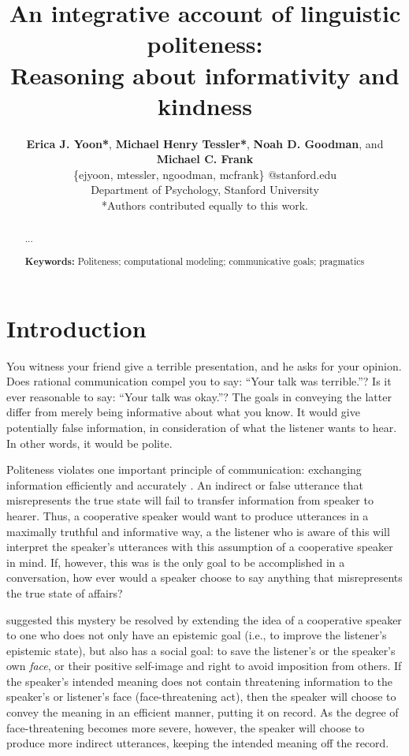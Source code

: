 \documentclass[10pt,letterpaper]{article}
\title{An integrative account of linguistic politeness: \\
Reasoning about informativity and kindness}
\author{ {\large \bf Erica J. Yoon*}, {\large \bf Michael Henry Tessler*}, {\large \bf Noah D. Goodman}, and {\large \bf Michael C. Frank}   \\
\{ejyoon, mtessler, ngoodman, mcfrank\} @stanford.edu \\ 
  Department of Psychology, Stanford University \\
  *Authors contributed equally to this work.}
\begin{document}
\maketitle


\begin{abstract}

...

\textbf{Keywords:} 
Politeness; computational modeling; communicative goals; pragmatics

\end{abstract}


\section{Introduction}

You witness your friend give a terrible presentation, and he asks for your opinion. 
Does rational communication compel you to say: ``Your talk was terrible.''?
Is it ever reasonable to say: ``Your talk was okay.''?
The goals in conveying the latter differ from merely being informative about what you know. 
It would give potentially false information, in consideration of what the listener wants to hear.
In other words, it would be polite.

Politeness violates one important principle of communication: exchanging information efficiently and accurately \cite{Grice1975}. An indirect or false utterance that misrepresents the true state will fail to transfer information from speaker to hearer. Thus, a cooperative speaker would want to produce utterances in a maximally truthful and informative way, a the listener who is aware of this will interpret the speaker's utterances with this assumption of a cooperative speaker in mind.
If, however, this was is the only goal to be accomplished in a conversation, how ever would a speaker choose to say anything that misrepresents the true state of affairs?

 suggested this mystery be resolved by extending the idea of a cooperative speaker to one who does not only have an epistemic goal (i.e., to improve the listener's epistemic state), but also has a social goal: to save the listener's or the speaker's own \emph{face}, or their positive self-image and right to avoid imposition from others. If the speaker's intended meaning does not contain threatening information to the speaker's or listener's face (face-threatening act), then the speaker will choose to convey the meaning in an efficient manner, putting it on record. As the degree of face-threatening becomes more severe, however, the speaker will choose to produce more indirect utterances, keeping the intended meaning off the record.
\end{document}
